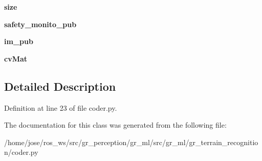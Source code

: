 \begin{DoxyCompactItemize}
{\bfseries size}
\item 
\mbox{\label{classgr__ml_1_1gr__terrain__recognition_1_1coder_1_1Features2Image_af618ac4b049541bd5dbaef41b17fa64e}} 
{\bfseries safety\+\_\+monito\+\_\+pub}
\item 
\mbox{\label{classgr__ml_1_1gr__terrain__recognition_1_1coder_1_1Features2Image_a0a3acebc03b71726431da02f74bf0ab0}} 
{\bfseries im\+\_\+pub}
\item 
\mbox{\label{classgr__ml_1_1gr__terrain__recognition_1_1coder_1_1Features2Image_a9f3bfe6a4701e5ce957e99a7e5fd864d}} 
{\bfseries cv\+Mat}
\end{DoxyCompactItemize}


\subsection{Detailed Description}


Definition at line 23 of file coder.\+py.



The documentation for this class was generated from the following file\+:\begin{DoxyCompactItemize}
\item 
/home/jose/ros\+\_\+ws/src/gr\+\_\+perception/gr\+\_\+ml/src/gr\+\_\+ml/gr\+\_\+terrain\+\_\+recognition/coder.\+py\end{DoxyCompactItemize}
